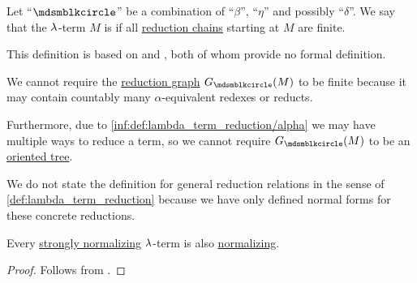 \begin{definition}\label{def:strongly_normalizing_lambda_term}\mimprovised
  Let \enquote{\( {\Anon} \)} be a combination of \enquote{\( \beta \)}, \enquote{\( \eta \)} and possibly \enquote{\( \delta \)}. We say that the \( {\mathrm \lambda} \)-term \( M \) is  if all \hyperref[def:lambda_term_reduction_graph]{reduction chains} starting at \( M \) are finite.
\end{definition}
\begin{comments}
  \item This definition is based on  and , both of whom provide no formal definition.

  \item We cannot require the \hyperref[def:lambda_term_reduction_graph]{reduction graph} \( G_{\Anon}(M) \) to be finite because it may contain countably many \( \alpha \)-equivalent redexes or reducts.

  Furthermore, due to \ref{inf:def:lambda_term_reduction/alpha} we may have multiple ways to reduce a term, so we cannot require \( G_{\Anon}(M) \) to be an \hyperref[def:oriented_tree]{oriented tree}.

  \item We do not state the definition for general reduction relations in the sense of \ref{def:lambda_term_reduction} because we have only defined normal forms for these concrete reductions.
\end{comments}

\begin{proposition}\label{thm:strongly_normalizing_term_is_normalizing}
  Every \hyperref[def:strongly_normalizing_lambda_term]{strongly normalizing} \( {\mathrm \lambda} \)-term is also \hyperref[def:lambda_term_normal_form]{normalizing}.
\end{proposition}
\begin{proof}
  Follows from .
\end{proof}

